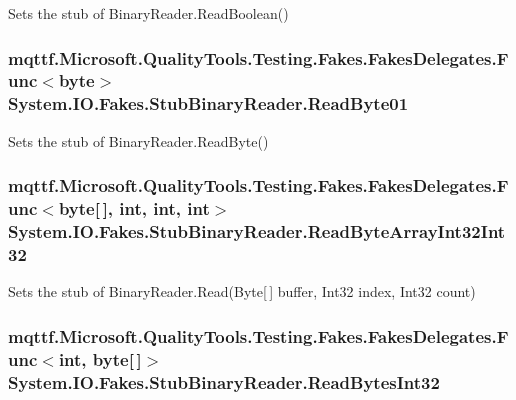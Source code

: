 Sets the stub of Binary\-Reader.\-Read\-Boolean()

\hypertarget{class_system_1_1_i_o_1_1_fakes_1_1_stub_binary_reader_a1556647b5d71ab3d7059ab1e0388e876}{
\subsubsection[{Read\-Byte01}]{\setlength{\rightskip}{0pt plus 5cm}mqttf.\-Microsoft.\-Quality\-Tools.\-Testing.\-Fakes.\-Fakes\-Delegates.\-Func$<$byte$>$ System.\-I\-O.\-Fakes.\-Stub\-Binary\-Reader.\-Read\-Byte01}}\label{class_system_1_1_i_o_1_1_fakes_1_1_stub_binary_reader_a1556647b5d71ab3d7059ab1e0388e876}


Sets the stub of Binary\-Reader.\-Read\-Byte()

\hypertarget{class_system_1_1_i_o_1_1_fakes_1_1_stub_binary_reader_a509da1f8651f81153729dda4457bece6}{
\subsubsection[{Read\-Byte\-Array\-Int32\-Int32}]{\setlength{\rightskip}{0pt plus 5cm}mqttf.\-Microsoft.\-Quality\-Tools.\-Testing.\-Fakes.\-Fakes\-Delegates.\-Func$<$byte\mbox{[}$\,$\mbox{]}, int, int, int$>$ System.\-I\-O.\-Fakes.\-Stub\-Binary\-Reader.\-Read\-Byte\-Array\-Int32\-Int32}}\label{class_system_1_1_i_o_1_1_fakes_1_1_stub_binary_reader_a509da1f8651f81153729dda4457bece6}


Sets the stub of Binary\-Reader.\-Read(\-Byte\mbox{[}$\,$\mbox{]} buffer, Int32 index, Int32 count)

\hypertarget{class_system_1_1_i_o_1_1_fakes_1_1_stub_binary_reader_aef633547d4502ec36627a7c6be23632b}{
\subsubsection[{Read\-Bytes\-Int32}]{\setlength{\rightskip}{0pt plus 5cm}mqttf.\-Microsoft.\-Quality\-Tools.\-Testing.\-Fakes.\-Fakes\-Delegates.\-Func$<$int, byte\mbox{[}$\,$\mbox{]}$>$ System.\-I\-O.\-Fakes.\-Stub\-Binary\-Reader.\-Read\-Bytes\-Int32}}\label{class_system_1_1_i_o_1_1_fakes_1_1_stub_binary_reader_aef633547d4502ec36627a7c6be23632b}


